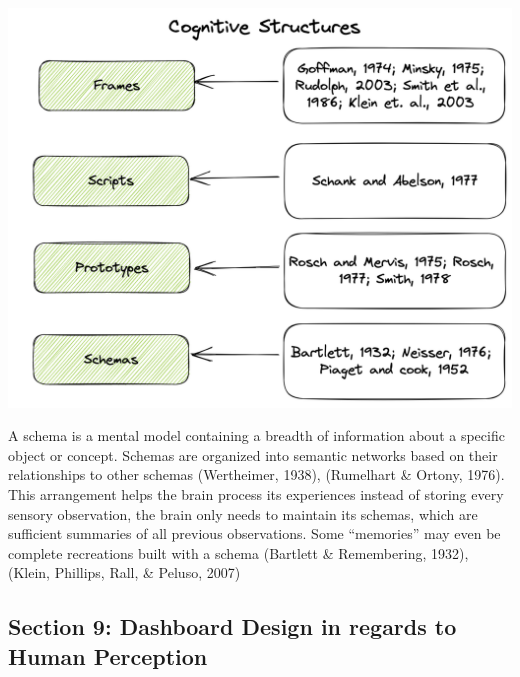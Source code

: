 \documentclass[print]{nuthesis}
\begin{document}
\begin{center}
\includegraphics[width=\textwidth]{figure/CognitiveStructuresCitationTimeline}
\end{center}

A schema is a mental model containing a breadth of information about a specific object or concept. Schemas are organized into semantic networks based on their relationships to other schemas (Wertheimer, 1938), (Rumelhart \& Ortony, 1976). This arrangement helps the brain process its experiences instead of storing every sensory observation, the brain only needs to maintain its schemas, which are sufficient summaries of all previous observations. Some ``memories'' may even be complete recreations built with a schema (Bartlett \& Remembering, 1932), (Klein, Phillips, Rall, \& Peluso, 2007)

\hypertarget{section-9-dashboard-design-in-regards-to-human-perception}{%
\subsection{Section 9: Dashboard Design in regards to Human Perception}\label{section-9-dashboard-design-in-regards-to-human-perception}}
\end{document}
